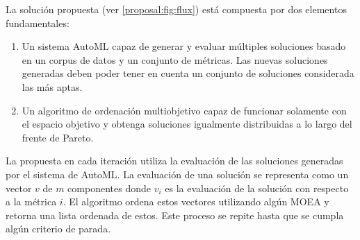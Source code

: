 La soluci\'on propuesta (ver \ref{proposal:fig:flux}) est\'a compuesta por dos elementos fundamentales:
\begin{enumerate}
    \item Un sistema AutoML capaz de generar y evaluar m\'ultiples soluciones basado en un corpus de datos y un conjunto de m\'etricas. Las nuevas soluciones generadas deben poder tener en cuenta un conjunto de soluciones considerada las m\'as aptas. %
    \item Un algoritmo de ordenaci\'on multiobjetivo capaz de funcionar solamente con el espacio objetivo y obtenga soluciones igualmente distribuidas a lo largo del frente de Pareto.
\end{enumerate}

La propuesta en cada iteraci\'on utiliza la evaluaci\'on de las soluciones generadas por el sistema de AutoML. La evaluaci\'on de una soluci\'on se representa como un vector $v$ de $m$ componentes donde $v_i$ es la evaluaci\'on de la soluci\'on con respecto a la m\'etrica $i$. El algoritmo ordena estos vectores utilizando alg\'un MOEA y retorna una lista ordenada de estos. Este proceso se repite hasta que se cumpla alg\'un criterio de parada.


